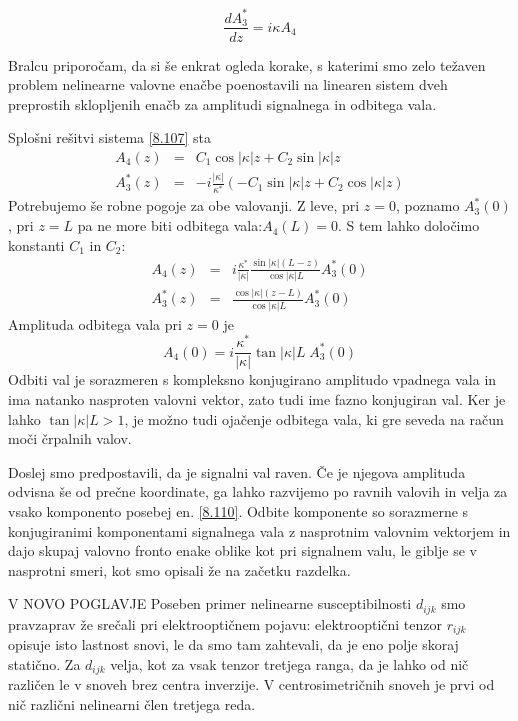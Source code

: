 \begin{equation}
\frac{dA_{3}^{*}}{dz}=i\kappa A_{4}\label{8.107}
\end{equation}


Bralcu priporočam, da si še enkrat ogleda korake, s katerimi smo zelo
težaven problem nelinearne valovne enačbe poenostavili na linearen
sistem dveh preprostih sklopljenih enačb za amplitudi signalnega in
odbitega vala.

Splošni rešitvi sistema \ref{8.107} sta 
\begin{eqnarray}
A_{4}\left(z\right) & = & C_{1}\cos\left|\kappa\right|z+C_{2}\sin\left|\kappa\right|z\label{8.108}\\
A_{3}^{*}\left(z\right) & = & -i\frac{\left|\kappa\right|}{\kappa^{*}}\left(-C_{1}\sin\left|\kappa\right|z+C_{2}\cos\left|\kappa\right|z\right)\nonumber 
\end{eqnarray}
 Potrebujemo še robne pogoje za obe valovanji. Z leve, pri $z=0$,
poznamo $A_{3}^{*}\left(0\right)$, pri $z=L$ pa ne more biti odbitega
vala:$A_{4}\left(L\right)=0$. S tem lahko določimo konstanti $C_{1}$
in $C_{2}$: 
\begin{eqnarray}
A_{4}\left(z\right) & = & i\frac{\kappa^{*}}{\left|\kappa\right|}\frac{\sin\left|\kappa\right|\left(L-z\right)}{\cos\left|\kappa\right|L}A_{3}^{*}\left(0\right)\label{8.109}\\
A_{3}^{*}\left(z\right) & = & \frac{\cos\left|\kappa\right|\left(z-L\right)}{\cos\left|\kappa\right|L}A_{3}^{*}\left(0\right)\nonumber 
\end{eqnarray}
 Amplituda odbitega vala pri $z=0$ je 
\begin{equation}
A_{4}\left(0\right)=i\frac{\kappa^{*}}{\left|\kappa\right|}\tan\left|\kappa\right|L\; A_{3}^{*}\left(0\right)\label{8.110}
\end{equation}
 Odbiti val je sorazmeren s kompleksno konjugirano amplitudo vpadnega
vala in ima natanko nasproten valovni vektor, zato tudi ime fazno
konjugiran val. Ker je lahko $\tan\left|\kappa\right|L>1$, je možno
tudi ojačenje odbitega vala, ki gre seveda na račun moči črpalnih
valov.

Doslej smo predpostavili, da je signalni val raven. Če je njegova
amplituda odvisna še od prečne koordinate, ga lahko razvijemo po ravnih
valovih in velja za vsako komponento posebej en. \ref{8.110}. Odbite
komponente so sorazmerne s konjugiranimi komponentami signalnega vala
z nasprotnim valovnim vektorjem in dajo skupaj valovno fronto enake
oblike kot pri signalnem valu, le giblje se v nasprotni smeri, kot
smo opisali že na začetku razdelka.

V NOVO POGLAVJE
Poseben primer nelinearne susceptibilnosti $d_{ijk}$ smo pravzaprav
že srečali pri elektrooptičnem pojavu: elektrooptični tenzor $r_{ijk}$
opisuje isto lastnost snovi, le da smo tam zahtevali, da je eno polje
skoraj statično. Za $d_{ijk}$ velja, kot za vsak tenzor tretjega
ranga, da je lahko od nič različen le v snoveh brez centra inverzije.
V centrosimetričnih snoveh je prvi od nič različni nelinearni člen
tretjega reda.